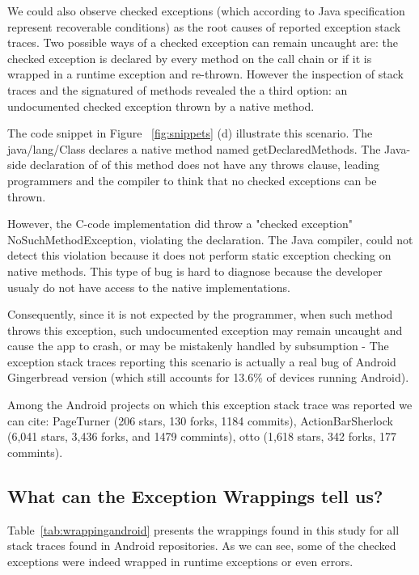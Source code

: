 \documentclass[conference]{IEEEtran}
\begin{document}
We could also observe checked exceptions (which according to Java specification represent
recoverable conditions) as the root causes of reported exception stack traces.
Two possible ways of a checked exception can remain uncaught are: the checked 
exception is declared by every method on the call chain or if it is wrapped in a 
runtime exception and re-thrown. However the inspection of stack traces 
and the signatured of methods revealed the a third option: an undocumented
checked exception thrown by a native method.

The code snippet in Figure ~\ref{fig:snippets} (d) illustrate this scenario.
 The java/lang/Class declares a native method named getDeclaredMethods. 
The Java-side declaration of of this method does not have any throws clause, 
leading programmers and the compiler to think that no checked exceptions can be thrown.

 However, the C-code implementation did throw a "checked exception" NoSuchMethodException, 
violating the declaration. The Java compiler, could not detect this violation because it does 
not perform static exception checking on native methods. This type of bug is hard to diagnose
because the developer usualy do not have access to the native implementations. 

Consequently, since it is not expected by the programmer, when such method throws 
this exception, such undocumented exception may remain
uncaught and cause the app to crash, or may be mistakenly handled by subsumption - 
The exception stack traces reporting this scenario is actually a real bug of Android 
Gingerbread version (which still accounts for 13.6\% of devices running Android).

Among the Android projects on which this exception stack trace was reported we can cite:
PageTurner (206 stars, 130 forks, 1184 commits), ActionBarSherlock (6,041 stars, 
3,436 forks, and 1479 commints), otto (1,618 stars,	342 forks, 	177 commints).



\noindent {}

\subsection{What can the Exception Wrappings tell us?}
Table~\ref{tab:wrappingandroid} presents the wrappings found in this study for all
stack traces found in Android repositories. As we can see, some of the checked
exceptions were indeed wrapped in runtime exceptions or even errors.
\end{document}
